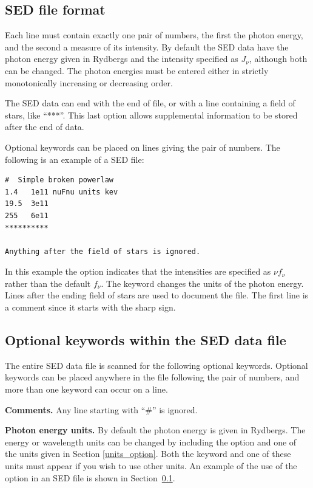 \subsection{SED file format}
\label{sec:SEDFormat}

Each line must contain exactly one pair of numbers, the first the photon energy, and the second a
measure of its intensity.
By default the SED data have the photon energy given in Rydbergs
and the intensity specified as $J_\nu$, although both can be changed.
The photon energies must be entered either in strictly monotonically increasing
or decreasing order.

The SED data can end with the end of file, or with a line containing a field
of stars, like ``***''.
This last option allows supplemental information to be stored after the end of data.

Optional keywords can be placed on lines giving the pair of numbers.  The following
is an example of a SED file:

\begin{verbatim}
#  Simple broken powerlaw
1.4   1e11 nuFnu units kev 
19.5  3e11 
255   6e11
**********

Anything after the field of stars is ignored.
\end{verbatim}

\noindent
In this example the  option indicates that the intensities are specified as $\nu f_\nu$
rather than the default $f_\nu$.
The  keyword changes the units of the photon energy.
Lines after the ending field of stars are used to document the file.
The first line is a comment since it starts with the sharp sign.

\subsection{Optional keywords within the SED data file}

The entire SED data file is scanned for the following optional keywords.
Optional keywords can be placed anywhere in the file following the pair of numbers, and
more than one keyword can occur on a line.

\textbf{Comments.}
Any line starting with ``\#'' is ignored.

\textbf{Photon energy units.}
By default the photon energy is given in Rydbergs.
The energy or wavelength units can be changed by including
the  option and one of the units given
in Section \ref{units_option}. 
Both the keyword  and one of
these units must appear if you wish to use other units. 
An example of the use
of the  option in an SED file is shown in Section~\ref{sec:SEDFormat}.

